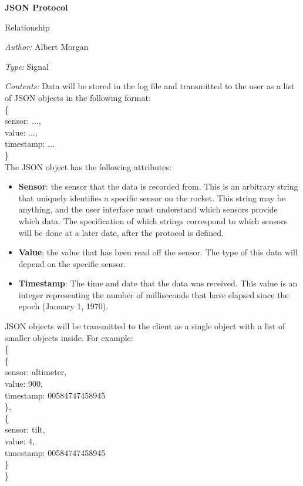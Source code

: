 \documentclass[10pt,draftclsnofoot,onecolumn]{IEEEtran}
\newcommand{\newrelationship}[4]{
	\begin{minipage}{\linewidth}
	\noindent\textbf{#2}
	
	\noindent Relationship
	
	\noindent\textit{Author:} #1

	\noindent\textit{Type:} #3

	\noindent\textit{Contents:} #4
	\vspace{.5cm}
	\end{minipage}
}
\begin{document}
	\newrelationship
	{Albert Morgan}
	{JSON Protocol}
	{Signal}
	{
		Data will be stored in the log file and transmitted to the user as a list of JSON objects in the following format:\\

\noindent\{\\
\hspace*{.5cm}sensor: ...,\\
\hspace*{.5cm}value: ...,\\
\hspace*{.5cm}timestamp: ...\\
\}\\

		The JSON object has the following attributes:
		\begin{itemize}
			\item\textbf{Sensor}: the sensor that the data is recorded from.
			This is an arbitrary string that uniquely identifies a specific sensor on the rocket.
			This string may be anything, and the user interface must understand which sensors provide which data.
			The specification of which strings correspond to which sensors will be done at a later date, after the protocol is defined.
			\item\textbf{Value}: the value that has been read off the sensor.
			The type of this data will depend on the specific sensor.
			\item\textbf{Timestamp}: The time and date that the data was received.
			This value is an integer representing the number of milliseconds that have elapsed since the epoch (January 1, 1970).
		\end{itemize}
	
			JSON objects will be transmitted to the client as a single object with a list of smaller objects inside. For example:\\

\noindent\{\\
\hspace*{.5cm}\{\\
\hspace*{1cm}sensor: altimeter,\\
\hspace*{1cm}value: 900,\\
\hspace*{1cm}timestamp: 00584747458945\\
\hspace*{.5cm}\},\\
\hspace*{.5cm}\{\\
\hspace*{1cm}sensor: tilt,\\
\hspace*{1cm}value: 4,\\
\hspace*{1cm}timestamp: 00584747458945\\
\hspace*{.5cm}\}\\
\}

	}
	
\end{document}
